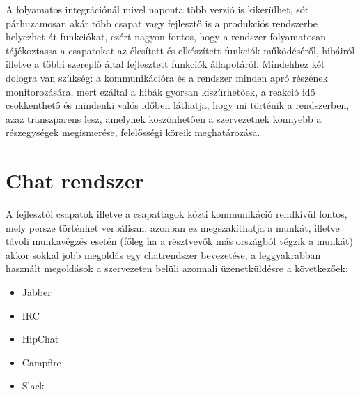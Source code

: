 A folyamatos integrációnál mivel naponta több verzió is kikerülhet, sőt párhuzamosan akár több csapat vagy fejlesztő is a produkciós rendszerbe helyezhet át funkciókat, ezért nagyon fontos, hogy a rendszer folyamatosan tájékoztassa a csapatokat az élesített és elkészített funkciók működéséről, hibáiról illetve a többi szereplő által fejlesztett funkciók állapotáról. Mindehhez két dologra van szükség: a kommunikációra és a rendszer minden apró részének monitorozására, mert ezáltal a hibák gyorsan kiszűrhetőek, a reakció idő csökkenthető és mindenki valós időben láthatja, hogy mi történik a rendszerben, azaz transzparens lesz, amelynek köszönhetően a szervezetnek könnyebb a részegységek megismerése, felelősségi köreik meghatározása.

\section{Chat rendszer}
A fejlesztői csapatok illetve a csapattagok közti kommunikáció rendkívül fontos, mely persze történhet verbálisan, azonban ez megszakíthatja a munkát, illetve távoli munkavégzés esetén (főleg ha a résztvevők más országból végzik a munkát) akkor sokkal jobb megoldás egy chatrendszer bevezetése, a leggyakrabban használt megoldások a szervezeten belüli azonnali üzenetküldésre a következőek:
\begin{itemize}
	\item Jabber
	\item IRC
	\item HipChat
	\item Campfire
	\item Slack
\end{itemize}

